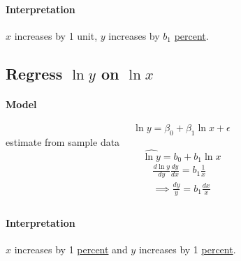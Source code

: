 \documentclass{article}
\begin{document}
	            \paragraph{Interpretation} $x$ increases by 1 unit, $y$ increases by $b_1$ \underline{percent}.
	       
	       \subsection{Regress $\ln{y}$ on $\ln{x}$}
	            \paragraph{Model}
	            \[
	                \ln{y} = \beta_0 + \beta_1 \ln{x} + \epsilon
	            \]
	            estimate from sample data
	            \[
	                \hat{\ln{y}} = b_0 + b_1 \ln{x}
	            \]
	            \begin{gather*}
	                \frac{d\ln{y}}{dy} \frac{dy}{dx} = b_1 \frac{1}{x} \\
	                \implies \frac{dy}{y} = b_1 \frac{dx}{x} \\
	            \end{gather*}
	            \paragraph{Interpretation} $x$ increases by 1 \underline{percent} and $y$ increases by 1 \underline{percent}.
\end{document}
